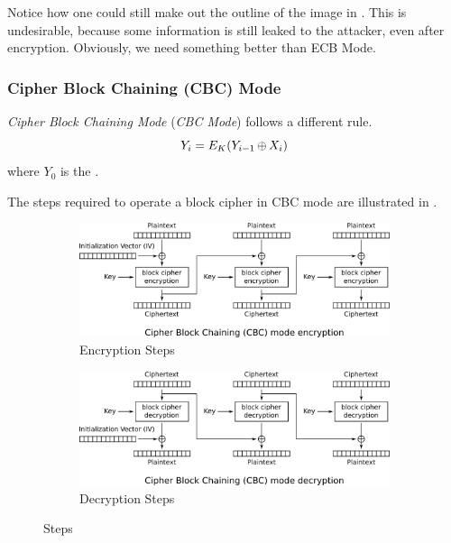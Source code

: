 Notice how one could still make out the outline of the image in .
This is undesirable, because some information is still leaked to the attacker, even after encryption.
Obviously, we need something better than ECB Mode.

\subsubsection{Cipher Block Chaining (CBC) Mode}\label{subsubsec:Cipher_Block_Chaining_Mode}
\begin{definition}\label{def:Cipher_Block_Chaining_Mode}
  \emph{Cipher Block Chaining Mode} (\emph{CBC Mode}) follows a different rule.
  \begin{equation}\label{eq:Cipher_Block_Chaining_Mode_Encryption}
    Y_{i} = E_{K}(Y_{i-1} \operatorname{\oplus} X_{i})
  \end{equation}
  where $Y_{0}$ is the .
\end{definition}

The steps required to operate a block cipher in CBC mode are illustrated in .
\begin{figure}[ht!]
  \centering
  \begin{subfigure}[h!]{0.45\linewidth}
    \centering
    \includegraphics[scale=0.55]{./Drawings/EDIN01-Cryptography/CBC_Mode-Encryption.png}
    \caption{ Encryption Steps}
    \label{subfig:CBC_Mode_Steps_Encryption}
  \end{subfigure}
  \vline{}
  \begin{subfigure}[h!]{0.45\linewidth}
    \centering
    \includegraphics[scale=0.55]{./Drawings/EDIN01-Cryptography/CBC_Mode-Decryption.png}
    \caption{ Decryption Steps}
    \label{subfig:CBC_Mode_Steps_Decryption}
  \end{subfigure}
  \caption{ Steps}
  \label{fig:Cipher_Block_Chaining_Mode_Steps}
\end{figure}

